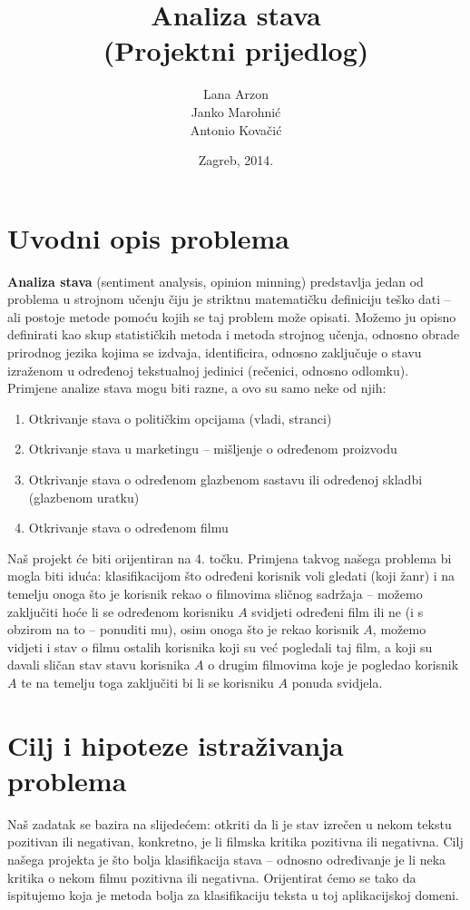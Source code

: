 \documentclass[12pt,a4paper,titlepage]{article}
\title{Analiza stava\\(Projektni prijedlog)}
\author{Lana Arzon\\Janko Marohnić\\Antonio Kovačić}
\date{Zagreb, 2014.}
\begin{document}
\maketitle

\tableofcontents

\newpage

\section{Uvodni opis problema}

\textbf{Analiza stava} (sentiment analysis, opinion minning) predstavlja jedan od problema u strojnom učenju čiju je striktnu matematičku definiciju teško dati -- ali postoje metode pomoću kojih se taj problem može opisati. Možemo ju opisno definirati kao skup statističkih metoda i metoda strojnog učenja, odnosno obrade prirodnog jezika kojima se izdvaja, identificira, odnosno zaključuje o stavu izraženom u određenoj tekstualnoj jedinici (rečenici, odnosno odlomku).\\
Primjene analize stava mogu biti razne, a ovo su samo neke od njih:
\begin{enumerate}
	\item Otkrivanje stava o političkim opcijama (vladi, stranci)
	\item Otkrivanje stava u marketingu -- mišljenje o određenom proizvodu
	\item Otkrivanje stava o određenom glazbenom sastavu ili određenoj skladbi (glazbenom uratku)
	\item Otkrivanje stava o određenom filmu
\end{enumerate}
Naš projekt će biti orijentiran na 4. točku. Primjena takvog našega problema bi mogla biti iduća: klasifikacijom što određeni korisnik voli gledati (koji žanr) i na temelju onoga što je korisnik rekao o filmovima sličnog sadržaja -- možemo zaključiti hoće li se određenom korisniku $A$ svidjeti određeni film ili ne (i s obzirom na to -- ponuditi mu), osim onoga što je rekao korisnik $A$, možemo vidjeti i stav o filmu ostalih korisnika koji su već pogledali taj film, a koji su davali sličan stav stavu korisnika $A$ o drugim filmovima koje je pogledao korisnik $A$ te na temelju toga zaključiti bi li se korisniku $A$ ponuda svidjela. 

\section{Cilj i hipoteze istraživanja problema}
Naš zadatak se bazira na slijedećem: otkriti da li je stav izrečen u  nekom tekstu pozitivan ili negativan, konkretno, je li filmska kritika pozitivna ili negativna. Cilj našega projekta je što bolja klasifikacija stava -- odnosno određivanje je li neka kritika o nekom filmu pozitivna ili negativna. Orijentirat ćemo se tako da ispitujemo koja je metoda bolja za klasifikaciju teksta u toj aplikacijskoj domeni.\\
\end{document}
